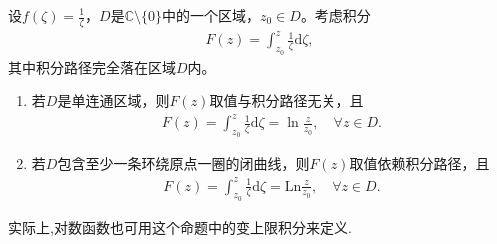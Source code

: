 \documentclass[../../main.tex]{subfiles}%
\begin{document}
\begin{proposition}\label{proposition:1/z的变限积分}
设$f(\zeta)=\frac{1}{\zeta}$，$D$是$\mathbb{C}\setminus\{0\}$中的一个区域，$z_0\in D$。考虑积分
\begin{align*}
F(z)=\int_{z_0}^z\frac{1}{\zeta}\mathrm{d}\zeta,
\end{align*}
其中积分路径完全落在区域$D$内。
\begin{enumerate}[(1)]
\item 若$D$是单连通区域，则$F(z)$取值与积分路径无关，且
\begin{align*}
F(z)=\int_{z_0}^z\frac{1}{\zeta}\mathrm{d}\zeta=\ln\frac{z}{z_0},\quad \forall z\in D.
\end{align*}

\item 若$D$包含至少一条环绕原点一圈的闭曲线，则$F(z)$取值依赖积分路径，且
\begin{align*}
F(z)=\int_{z_0}^z\frac{1}{\zeta}\mathrm{d}\zeta=\mathrm{Ln}\frac{z}{z_0},\quad \forall z\in D.
\end{align*}
\end{enumerate}
\end{proposition}
\begin{remark}
实际上,对数函数也可用这个命题中的变上限积分来定义.
\end{remark}
\end{document}
